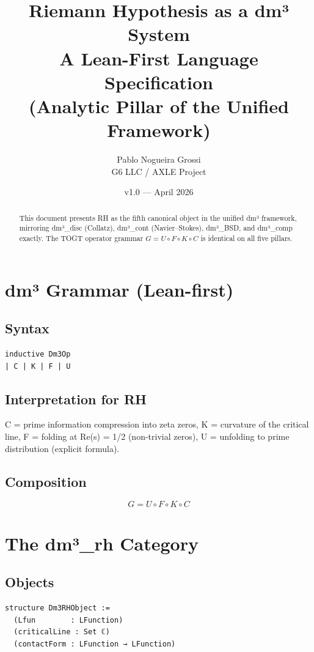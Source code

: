 \documentclass[11pt,a4paper]{article}
\title{\textbf{Riemann Hypothesis as a dm³ System}\\
A Lean-First Language Specification \\
(Analytic Pillar of the Unified Framework)}
\author{Pablo Nogueira Grossi \\ G6 LLC / AXLE Project}
\date{v1.0 — April 2026}
\begin{document}
\maketitle

\begin{abstract}
This document presents RH as the fifth canonical object in the unified dm³ framework, mirroring dm³\_disc (Collatz), dm³\_cont (Navier–Stokes), dm³\_BSD, and dm³\_comp exactly. The TOGT operator grammar \(G = U \circ F \circ K \circ C\) is identical on all five pillars.
\end{abstract}

\section{dm³ Grammar (Lean-first)}

\subsection{Syntax}
\begin{lstlisting}
inductive Dm3Op
| C | K | F | U
\end{lstlisting}

\subsection{Interpretation for RH}
C = prime information compression into zeta zeros,  
K = curvature of the critical line,  
F = folding at Re(s) = 1/2 (non-trivial zeros),  
U = unfolding to prime distribution (explicit formula).

\subsection{Composition}
\[
G = U \circ F \circ K \circ C
\]

\section{The dm³\_rh Category}

\subsection{Objects}
\begin{lstlisting}
structure Dm3RHObject :=
  (Lfun        : LFunction)
  (criticalLine : Set ℂ)
  (contactForm : LFunction → LFunction)
\end{lstlisting}
\end{document}
